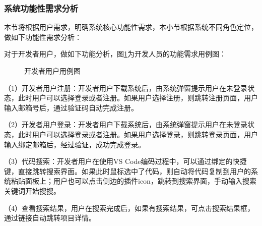 \documentclass[UTF8,a4paper,12pt]{ctexart}
\numberwithin{equation}{section}
\begin{document}
\subsubsection{系统功能性需求分析}
本节将根据用户需求，明确系统核心功能性需求，本小节根据系统不同角色定位，做如下功能性需求分析：\par
对于开发者用户，做如下功能分析，图\ref{user}为开发人员的功能需求用例图：\par
\begin{figure}[H]
	\caption{开发者用户用例图}
	\label{user}
\end{figure}
（1）开发者用户注册：开发者用户下载系统后，由系统弹窗提示用户在未登录状态，此时用户可以选择登录或者注册。如果用户选择注册，则跳转注册页面，用户输入邮箱号后，通过验证码自动完成注册。\par
（2）开发者用户登录：开发者用户下载系统后，由系统弹窗提示用户在未登录状态，此时用户可以选择登录或者注册。如果用户选择登录，则跳转登录页面，用户输入绑定邮箱后，经过验证，成功完成登录。\par
（3）代码搜索：开发者用户在使用VS Code编码过程中，可以通过绑定的快捷键，直接跳转搜索界面。如果此时鼠标选中了代码，则自动将代码复制到用户的系统粘贴面板上；用户也可以点击侧边的插件icon，跳转到搜索界面，手动输入搜索关键词开始搜搜。\par
（4）查看搜索结果，用户在搜索完成后，如果有搜索结果，可点击搜索结果框，通过链接自动跳转项目详情。\par
\end{document}
